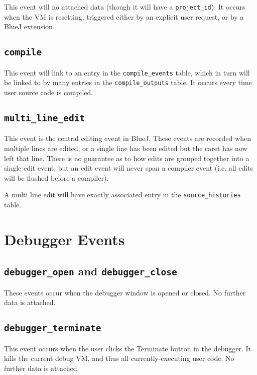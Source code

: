 \documentclass{book}
\begin{document}
This event will no attached data (though it will have a
\texttt{project\_id}).  It occurs when the VM is resetting, triggered either
by an explicit user request, or by a BlueJ extension.

\subsection{\texttt{compile}}

This event will link to an entry in the \texttt{compile\_events} table, which
in turn will be linked to by many entries in the \texttt{compile\_outputs}
table.  It occurs every time user source code is compiled.

\subsection{\texttt{multi\_line\_edit}}

This event is the central editing event in BlueJ.  These events are recorded
when multiple lines are edited, or a single line has been edited but the caret
has now left that line.  There is no guarantee as to how edits are grouped
together into a single edit event, but an edit event will never span a
compiler event (i.e. all edits will be flushed before a compiler).

A multi line edit will have exactly associated entry in the
\texttt{source\_histories} table.

\section{Debugger Events}


\subsection{\lstinline|debugger_open| and \lstinline|debugger_close|}

These events occur when the debugger window is opened or closed.  No further
data is attached.

\subsection{\lstinline|debugger_terminate|}

This event occurs when the user clicks the Terminate button in the debugger.
It kills the current debug VM, and thus all currently-executing user code.  No
further data is attached.
\end{document}
